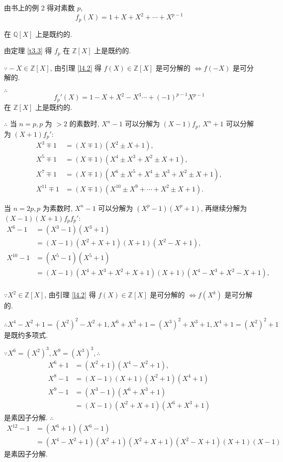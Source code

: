 \documentclass[color=black,device=normal,lang=cn,mode=geye]{elegantnote}
\begin{document}
\begin{solution}
    由书上的例 2 得对素数 $p$,
    \[f_p(X)=1+X+X^2+\cdots+X^{p-1}\]

    在 $\mathbb{Q}[X]$ 上是既约的.

    由定理 \ref{t3.3} 得 $f_p$ 在 $\mathbb{Z}[X]$ 上是既约的.

    $\because-X\in\mathbb{Z}[X]$, 由引理 \ref{l4.2} 得 $f(X)\in\mathbb{Z}[X]$ 是可分解的 $\Leftrightarrow f(-X)$ 是可分解的.

    $\therefore$
    \[f_p'(X)=1-X+X^2-X^3\cdots+(-1)^{p-1}X^{p-1}\]
    在 $\mathbb{Z}[X]$ 上是既约的.

    $\therefore$ 当 $n=p,p$ 为 $>2$ 的素数时, $X^n-1$ 可以分解为 $(X-1)f_p$, $X^n+1$ 可以分解为 $(X+1)f_p'$:
    \begin{align*}
        X^3\mp1 & =(X\mp1)(X^2\pm X+1), \\
        X^5\mp1 & =(X\mp1)(X^4\pm X^3+X^2\pm X+1), \\
        X^7\mp1 & =(X\mp1)(X^6\pm X^5+X^4\pm X^3+X^2\pm X+1), \\
        X^{11}\mp1 & =(X\mp1)(X^{10}\pm X^9+\cdots+X^2\pm X+1).
    \end{align*}

    当 $n=2p,p$ 为素数时, $X^n-1$ 可以分解为 $(X^p-1)(X^p+1)$, 再继续分解为 $(X-1)(X+1)f_pf_p'$:
    \begin{align*}
        X^6-1 & =(X^3-1)(X^3+1) \\
        & =(X-1)(X^2+X+1)(X+1)(X^2-X+1), \\
        X^{10}-1 & =(X^5-1)(X^5+1) \\
        & =(X-1)(X^4+X^3+X^2+X+1)(X+1)(X^4-X^3+X^2-X+1), \\
    \end{align*}

    $\because X^2\in\mathbb{Z}[X]$, 由引理 \ref{l4.2} 得 $f(X)\in\mathbb{Z}[X]$ 是可分解的 $\Leftrightarrow f(X^k)$ 是可分解的.

    $\therefore X^4-X^2+1=(X^2)^2-X^2+1,X^6+X^3+1=(X^3)^2+X^3+1,X^4+1=(X^2)^2+1$ 是既约多项式.

    $\because X^6=(X^2)^3,X^9=(X^3)^3,\therefore$
    \begin{align*}
        X^6+1 & =(X^2+1)(X^4-X^2+1), \\
        X^8-1 & =(X-1)(X+1)(X^2+1)(X^4+1) \\
        X^9-1 & =(X^3-1)(X^6+X^3+1) \\
        & =(X-1)(X^2+X+1)(X^6+X^3+1)
    \end{align*}
    是素因子分解. $\therefore$
    \begin{align*}
        X^{12}-1 & =(X^6+1)(X^6-1) \\
        & =(X^4-X^2+1)(X^2+1)(X^2+X+1)(X^2-X+1)(X+1)(X-1)
    \end{align*}
    是素因子分解.
\end{solution}
\end{document}
